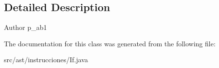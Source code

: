 \subsection{Detailed Description}
\begin{DoxyAuthor}{Author}
p\+\_\+ab1 
\end{DoxyAuthor}


The documentation for this class was generated from the following file\+:\begin{DoxyCompactItemize}
\item 
src/ast/instrucciones/If.\+java\end{DoxyCompactItemize}
